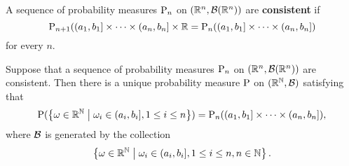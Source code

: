 \begin{definition}
    A sequence of probability measures $\P_n$ on $(\R^n, \B(\R^n))$ 
    are  \textbf{consistent} if 
    \begin{equation*}
        \P_{n+1}((a_1, b_1]\times\cdots\times(a_n, b_n]\times\R 
        = \P_n((a_1, b_1]\times\cdots\times(a_n, b_n])
    \end{equation*}
    for every $n$. 
\end{definition}

\begin{theorem}
    Suppose that a sequence of probability measures $\P_n$ on $(\R^n, \B(\R^n))$ 
    are consistent. Then there is a unique probability measure $\P$ on $(\R^\N, \B)$ 
    satisfying that 
    \begin{equation*}
        \P(\Set{\omega\in\R^\N}{\omega_i\in(a_i, b_i], 1\leq i\leq n}) = \P_n((a_1, b_1]\times\cdots\times(a_n, b_n]),  
    \end{equation*}
    where $\B$ is generated by the collection 
    \begin{equation*}
        \Set{\omega\in\R^\N}{\omega_i\in(a_i, b_i], 1\leq i\leq n, n\in\N}. 
    \end{equation*}
\end{theorem}

